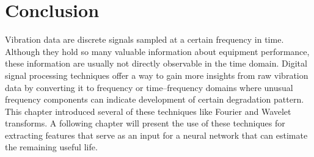 \section{Conclusion}
Vibration data are discrete signals sampled at a certain frequency in time. Although they hold so many valuable information about equipment performance, these information are usually not directly observable in the time domain. Digital signal processing techniques offer a way to gain more insights from raw vibration data by converting it to frequency or time–frequency domains where unusual frequency components can indicate development of certain degradation pattern. This chapter introduced several of these techniques like Fourier and Wavelet transforms. A following chapter will present the use of these techniques for extracting features that serve as an input for a neural network that can estimate the remaining useful life.
